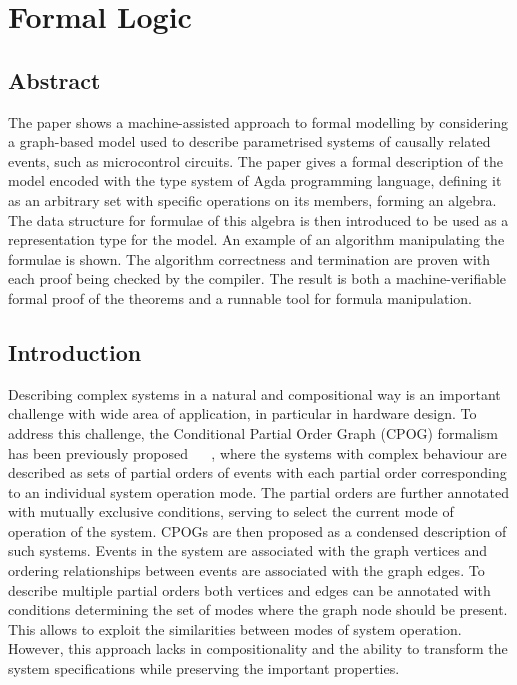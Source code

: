 \section{Formal Logic}


\subsection{Abstract}
The paper shows a machine-assisted approach to formal modelling by considering a graph-based model used to describe parametrised systems of causally related events, such as microcontrol circuits. The paper gives a formal description of the model encoded with the type system of Agda programming language, defining it as an arbitrary set with specific operations on its members, forming an algebra. The data structure for formulae of this algebra is then introduced to be used as a representation type for the model. An example of an algorithm manipulating the formulae is shown. The algorithm correctness and termination are proven with each proof being checked by the compiler. The result is both a machine-verifiable formal proof of the theorems and a runnable tool for formula manipulation.

\subsection{Introduction}

Describing complex systems in a natural and compositional way is an important challenge with wide area of application, in particular in hardware design.
To address this challenge, the Conditional Partial Order Graph (CPOG) formalism has been previously proposed ~\cite{2009_mokhov_phd} ~\cite{2010_mokhov_ieee}, where the systems with
complex behaviour are described as sets of partial orders of events with each partial order corresponding to an individual system operation mode.
The partial orders are further annotated with mutually exclusive conditions,
serving to select the current mode of operation of the system. CPOGs are then proposed as a condensed description of such systems.
Events in the system are associated with the graph vertices and ordering relationships between events are associated with the graph edges.
To describe multiple partial orders both vertices and edges can be annotated with conditions determining the set of modes 
where the graph node should be present. This allows to exploit the similarities between modes of system operation.
However, this approach lacks in compositionality and the ability to transform the system specifications while preserving the important properties.

